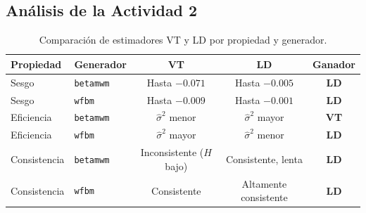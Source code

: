 \vspace{0.3cm}

\noindent


\subsection{Análisis de la Actividad 2}

\begin{table}[H]
\centering
\caption{Comparación de estimadores VT y LD por propiedad y generador.}
\label{tab:resumen_a2}
\renewcommand{\arraystretch}{1.3}
\begin{tabular}{llccc}
\toprule
\textbf{Propiedad} & \textbf{Generador} & \textbf{VT} & \textbf{LD} &
\textbf{Ganador} \\
\midrule
Sesgo & \texttt{betamwm} & Hasta $-0.071$ & Hasta $-0.005$ & \textbf{LD} \\
Sesgo & \texttt{wfbm}    & Hasta $-0.009$ & Hasta $-0.001$ & \textbf{LD} \\
\midrule
Eficiencia & \texttt{betamwm} & $\hat{\sigma}^2$ menor & $\hat{\sigma}^2$ mayor & \textbf{VT} \\
Eficiencia & \texttt{wfbm}    & $\hat{\sigma}^2$ mayor & $\hat{\sigma}^2$ menor & \textbf{LD} \\
\midrule
Consistencia & \texttt{betamwm} & Inconsistente ($H$ bajo) & Consistente, lenta & \textbf{LD} \\
Consistencia & \texttt{wfbm}    & Consistente             & Altamente consistente & \textbf{LD} \\
\bottomrule
\end{tabular}
\end{table}


